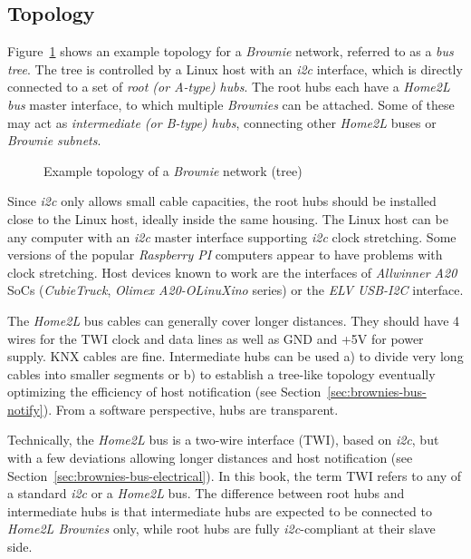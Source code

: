 \documentclass[12pt,english,parskip=half,headheight=19pt]{scrreprt}
\newcommand{\figsvg}[2][]{}            %
\newcommand{\figsvg}[2][]{\href{#2}{}} %
\begin{document}
\subsection{Topology}
\label{sec:brownies-bus-topology}

Figure~\ref{fig:brownies-topology} shows an example topology for a \textit{Brownie} network, referred to as a \textit{bus tree}. The tree is controlled by a Linux host with an \textit{i2c} interface, which is directly connected to a set of \textit{root (or A-type) hubs}. The root hubs each have a \textit{Home2L bus} master interface, to which multiple \textit{Brownies} can be attached. Some of these may act as \textit{intermediate (or B-type) hubs}, connecting other \textit{Home2L} buses or \textit{Brownie subnets}.

\begin{figure}[ht]
  \centering
  \figsvg[width=\linewidth]{figs/brownies-topology.svg}
  \caption[l]{Example topology of a \textit{Brownie} network (tree)}
  \label{fig:brownies-topology}
\end{figure}

Since \textit{i2c} only allows small cable capacities, the root hubs should be installed close to the Linux host, ideally inside the same housing. The Linux host can be any computer with an \textit{i2c} master interface supporting \textit{i2c} clock stretching. Some versions of the popular \textit{Raspberry PI} computers appear to have problems with clock stretching. Host devices known to work are the interfaces of \textit{Allwinner A20} SoCs (\textit{CubieTruck}, \textit{Olimex A20-OLinuXino} series) or the \textit{ELV USB-I2C} interface.

The \textit{Home2L} bus cables can generally cover longer distances. They should have 4 wires for the TWI clock and data lines as well as GND and +5V for power supply. KNX cables are fine. Intermediate hubs can be used a) to divide very long cables into smaller segments or b) to establish a tree-like topology eventually optimizing the efficiency of host notification (see Section~\ref{sec:brownies-bus-notify}). From a software perspective, hubs are transparent.

Technically, the \textit{Home2L} bus is a two-wire interface (TWI), based on \textit{i2c}, but with a few deviations allowing longer distances and host notification (see Section~\ref{sec:brownies-bus-electrical}). In this book, the term TWI refers to any of a standard \textit{i2c} or a \textit{Home2L} bus. The difference between root hubs and intermediate hubs is that intermediate hubs are expected to be connected to \textit{Home2L Brownies} only, while root hubs are fully \textit{i2c}-compliant at their slave side.
\end{document}
